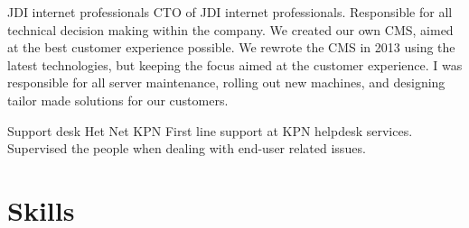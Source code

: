 \documentclass[11pt,a4paper]{moderncv}
\begin{document}
\vspace*{0.2\baselineskip}
{JDI internet professionals}
{}
{}
{}
{
CTO of JDI internet professionals. Responsible for all technical decision
making within the company.
We created our own CMS, aimed at the best customer experience possible. We
rewrote the CMS in 2013 using the latest technologies, but keeping the focus
aimed at the customer experience.
I was responsible for all server maintenance, rolling out new machines,
and designing tailor made solutions for our customers.
}

\vspace*{0.2\baselineskip}
{Support desk Het Net}
{KPN}
{}
{}
{
First line support at KPN helpdesk services. Supervised the people when dealing
with end-user related issues.
}

\section{Skills}



\end{document}
